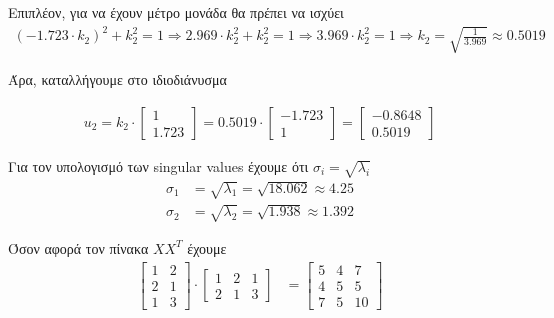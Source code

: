 \documentclass{article}
\begin{document}
	\noindent
	Επιπλέον, για να έχουν μέτρο μονάδα θα πρέπει να ισχύει
	\begin{align*}	
		(-1.723 \cdot k_{2})^2 + k_{2}^2 = 1 \Rightarrow 
		2.969 \cdot k_{2}^2 + k_{2}^2 = 1 \Rightarrow 
		3.969 \cdot k_{2}^2 = 1 \Rightarrow
		k_{2} = \sqrt{\frac{1}{3.969}} \approx 0.5019
	\end{align*}	
	
	\noindent
	Άρα, καταλλήγουμε στο ιδιοδιάνυσμα
	
	\begin{align*}	
		u_{2} = 
		k_{2} \cdot
		\begin{bmatrix}
			1 \\
			1.723 
		\end{bmatrix} = 
		0.5019 \cdot
		\begin{bmatrix}
			-1.723 \\
			1
		\end{bmatrix} = 
		\begin{bmatrix}
			-0.8648 \\
			0.5019
		\end{bmatrix}
	\end{align*}

	\noindent
	Για τον υπολογισμό των singular values έχουμε ότι $σ_{i} = \sqrt{λ_{i}}$
	\begin{align*}	
		σ_{1} &= \sqrt{λ_{1}} = \sqrt{18.062} \approx 4.25 \\
		σ_{2} &= \sqrt{λ_{2}} = \sqrt{1.938} \approx 1.392
	\end{align*}

	\pagebreak
	\noindent
	Όσον αφορά τον πίνακα $XX^T$ έχουμε
	\begin{align*}
		\begin{bmatrix}
			1 & 2 \\
			2 & 1 \\
			1 & 3
		\end{bmatrix} 
		\cdot 		
		\begin{bmatrix}
			1 & 2 & 1 \\
			2 & 1 & 3
		\end{bmatrix}
		&= 
		\begin{bmatrix}
			5 & 4 & 7 \\
			4 & 5 & 5 \\
			7 & 5 & 10 
		\end{bmatrix}
	\end{align*}
	
\end{document}
